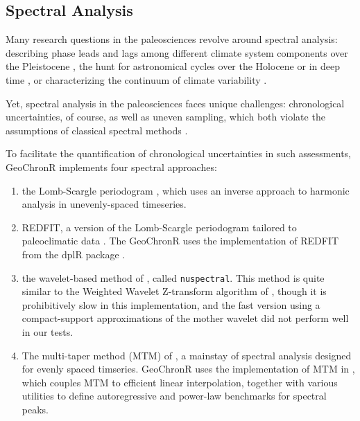\documentclass[gchron, manuscript]{copernicus}
\begin{document}
\hypertarget{sec:spec_theory}{%
\subsection{Spectral Analysis}\label{sec:spec_theory}}

Many research questions in the paleosciences revolve around spectral analysis: describing phase leads and lags among different climate system components over the Pleistocene \citep[SPECMAP,][]{imbrie1984orbital}, the hunt for astronomical cycles over the Holocene \citep{mill_monograph, bond2001} or in deep time \citep{MeyersSageman_2007, Meyers_2012, Meyers_2015}, or characterizing the continuum of climate variability \citep{Huybers_Curry2006, ZhuPNAS2019}.

Yet, spectral analysis in the paleosciences faces unique challenges: chronological uncertainties, of course, as well as uneven sampling, which both violate the assumptions of classical spectral methods \citep{Ghil02}.

To facilitate the quantification of chronological uncertainties in such assessments, GeoChronR implements four spectral approaches:

\begin{enumerate}
\def\labelenumi{\arabic{enumi}.}
\item
  the Lomb-Scargle periodogram \citep{VanderPlas_2018}, which uses an inverse approach to harmonic analysis in unevenly-spaced timeseries.
\item
  REDFIT, a version of the Lomb-Scargle periodogram tailored to paleoclimatic data \citep{SchulzMudelsee_02, Mudelsee_02, Mudelsee_NPG09}.
  The GeoChronR uses the implementation of REDFIT from the dplR package \citep{Bunn2008115}.
\item
  the wavelet-based method of \citet{Mathias_JSS04}, called \texttt{nuspectral}. This method is quite similar to the Weighted Wavelet Z-transform algorithm of \citet{Foster_AJ96}, though it is prohibitively slow in this implementation, and the fast version using a compact-support approximations of the mother wavelet did not perform well in our tests.
\item
  The multi-taper method (MTM) of \citet{thomson82}, a mainstay of spectral analysis \citep{Ghil02} designed for evenly spaced timseries.
  GeoChronR uses the implementation of MTM in \citet{astrochron}, which couples MTM to efficient linear interpolation, together with various utilities to define autoregressive and power-law benchmarks for spectral peaks.
\end{enumerate}
\end{document}
